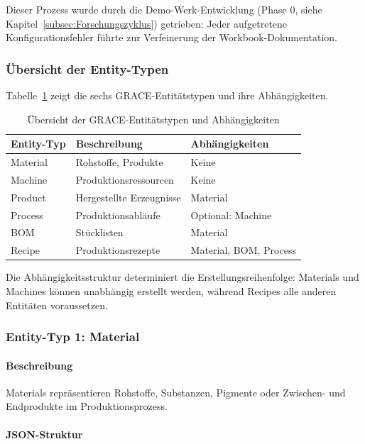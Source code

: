 \noindent Dieser Prozess wurde durch die Demo-Werk-Entwicklung (Phase 0, siehe Kapitel~\ref{subsec:Forschungszyklus}) getrieben: Jeder aufgetretene Konfigurationsfehler führte zur Verfeinerung der Workbook-Dokumentation.

\subsubsection{Übersicht der Entity-Typen}

Tabelle~\ref{tab:entity_typen_uebersicht} zeigt die sechs GRACE-Entitätstypen und ihre Abhängigkeiten.

\begin{table}[h]
\centering
\caption{Übersicht der GRACE-Entitätstypen und Abhängigkeiten}
\label{tab:entity_typen_uebersicht}
\begin{tabular}{lll}
\toprule
\textbf{Entity-Typ} & \textbf{Beschreibung} & \textbf{Abhängigkeiten} \\
\midrule
Material & Rohstoffe, Produkte & Keine \\
Machine & Produktionsressourcen & Keine \\
Product & Hergestellte Erzeugnisse & Material \\
Process & Produktionsabläufe & Optional: Machine \\
BOM & Stücklisten & Material \\
Recipe & Produktionsrezepte & Material, BOM, Process \\
\bottomrule
\end{tabular}
\end{table}

\noindent Die Abhängigkeitsstruktur determiniert die Erstellungsreihenfolge: Materials und Machines können unabhängig erstellt werden, während Recipes alle anderen Entitäten voraussetzen.

\subsubsection{Entity-Typ 1: Material}

\paragraph{Beschreibung}

Materials repräsentieren Rohstoffe, Substanzen, Pigmente oder Zwischen- und Endprodukte im Produktionsprozess.

\paragraph{JSON-Struktur}

